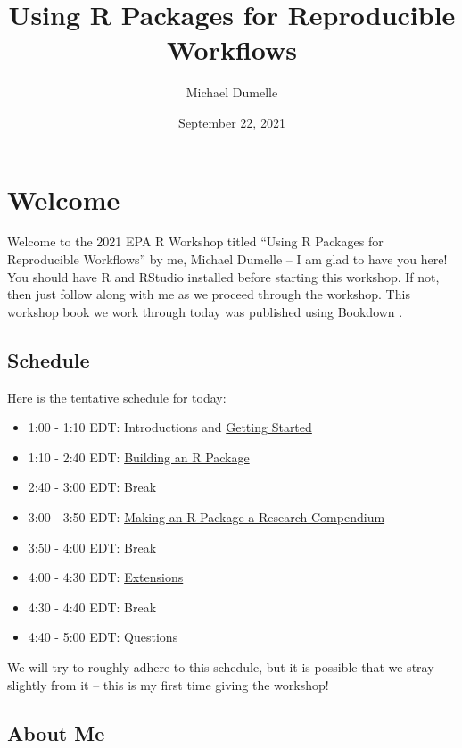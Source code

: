 \documentclass[
]{book}
\title{Using R Packages for Reproducible Workflows}
\author{Michael Dumelle}
\date{September 22, 2021}
\providecommand{\tightlist}{%
  \setlength{\itemsep}{0pt}\setlength{\parskip}{0pt}}
\begin{document}
\maketitle

{
\setcounter{tocdepth}{1}
\tableofcontents
}
\hypertarget{welcome}{%
\chapter*{Welcome}\label{welcome}}

Welcome to the 2021 EPA R Workshop titled ``Using R Packages for Reproducible Workflows'' by me, Michael Dumelle -- I am glad to have you here! You should have R and RStudio installed before starting this workshop. If not, then just follow along with me as we proceed through the workshop. This workshop book we work through today was published using Bookdown \citep{xie2016bookdown}.

\hypertarget{schedule}{%
\section*{Schedule}\label{schedule}}

Here is the tentative schedule for today:

\begin{itemize}
\tightlist
\item
  1:00 - 1:10 EDT: Introductions and \protect\hyperlink{getting-started}{Getting Started}
\item
  1:10 - 2:40 EDT: \protect\hyperlink{r-package}{Building an R Package}
\item
  2:40 - 3:00 EDT: Break
\item
  3:00 - 3:50 EDT: \protect\hyperlink{r-package-rc}{Making an R Package a Research Compendium}
\item
  3:50 - 4:00 EDT: Break
\item
  4:00 - 4:30 EDT: \protect\hyperlink{extensions}{Extensions}
\item
  4:30 - 4:40 EDT: Break
\item
  4:40 - 5:00 EDT: Questions
\end{itemize}

We will try to roughly adhere to this schedule, but it is possible that we stray slightly from it -- this is my first time giving the workshop!

\hypertarget{about-me}{%
\section*{About Me}\label{about-me}}
\end{document}
